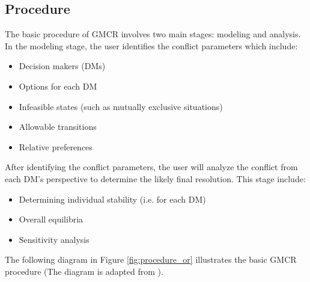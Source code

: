 \documentclass[letterpaper,12pt,titlepage,oneside,final]{book}
\begin{document}
\subsection{Procedure}
The basic procedure of GMCR involves two main stages: modeling and analysis. In the modeling stage, the user identifies the conflict parameters which include:
\begin{itemize}
\item Decision makers (DMs)
\item Options for each DM
\item Infeasible states (such as mutually exclusive situations)
\item Allowable transitions
\item Relative preferences
\end{itemize}

After identifying the conflict parameters, the user will analyze the conflict from each DM's perspective to determine the likely final resolution. This stage include:
\begin{itemize}
\item Determining individual stability (i.e. for each DM)
\item Overall equilibria
\item Sensitivity analysis
\end{itemize}

The following diagram in Figure \ref{fig:procedure_or} illustrates the basic GMCR procedure (The diagram is adapted from \citet{fang1993}).
\end{document}
